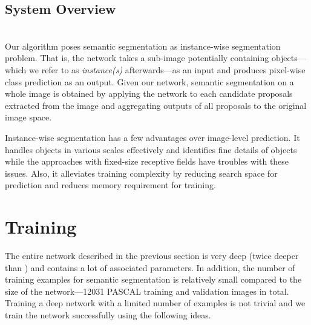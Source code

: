 \documentclass[10pt,twocolumn,letterpaper]{article}
\begin{document}
\iffalse
{\color{blue} Discussion on relation between unpooling and deconvolution---unpooling capture \textit{example-specific} information to produce precise segmentation, while filters in deconvolution layers capture \textit{class-specific} shape informations}

{\color{blue} it would be effective if we compare the final activation map from deconvolution network with the outputs of FCN---it would clearly show that our method produce much finer and detailed outputs than FCN. }.
\fi

\iffalse
[unpooling---]
[deconvolution---]
[Discussion of evolution of object shape across layers.
In lower layers, overall shape of the object such as location, surface and coarse configurations are captured. 
In higher layers, detailed shape of the object are discovered.
In higher layers, class-specific fine details are amplified while noisy activations from regions non-relevant to class are suppressed.
\fi




\subsection{System Overview}
\ifdefined{} \\ \fi
Our algorithm poses semantic segmentation as instance-wise segmentation problem. 
That is, the network takes a sub-image potentially containing objects---which we refer to as \textit{instance(s)} afterwards---as an input and produces pixel-wise class prediction as an output. 
Given our network, semantic segmentation on a whole image is obtained by applying the network to each candidate proposals extracted from the image and aggregating outputs of all proposals to the original image space.

Instance-wise segmentation has a few advantages over image-level prediction.
It handles objects in various scales effectively and identifies fine details of objects while the approaches with fixed-size receptive fields have troubles with these issues.
Also, it alleviates training complexity by reducing search space for prediction and reduces memory requirement for training.


 


\section{Training}
\label{sec:training}
The entire network described in the previous section is very deep (twice deeper than \cite{Vgg16}) and contains a lot of associated parameters.
In addition, the number of training examples for semantic segmentation is relatively small compared to the size of the network---12031 PASCAL training and validation images in total.
Training a deep network with a limited number of examples is not trivial and we train the network successfully using the following ideas.
\end{document}
